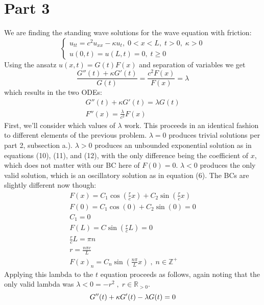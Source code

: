 \documentclass{article}
\begin{document}
\section*{Part 3}
We are finding the standing wave solutions for the wave equation with friction:
\[
  \begin{cases}
			u_{tt} = c^2u_{xx} - \kappa u_t ,\;  0 < x < L ,\;  t> 0 ,\;  \kappa >0\\                
			u(0,t) = u(L,t) = 0, \;  t \geq 0
            \end{cases}
\]
Using the ansatz $u(x,t) = G(t)F(x)$ and separation of variables we get 
\begin{equation}
\frac{G''(t) + \kappa G'(t)}{G(t)} = \frac{c^2F(x)}{F(x)} = \lambda
\end{equation}
which results in the two ODEs:
\begin{equation}
\begin{aligned}
G''(t) + \kappa G'(t) = \lambda G(t)\\
F''(x) = \frac{\lambda}{c^2}F(x)
\end{aligned}
\end{equation}
First, we'll consider which values of $\lambda$ work. This proceeds in an identical fashion to different elements of the previous problem. $\lambda = 0$ produces trivial solutions per part 2, subsection a.). $\lambda >0$ produces an unbounded exponential solution as in equations (10), (11), and (12), with the only difference being the coefficient of $x$, which does not matter with our BC here of $F(0) = 0$. $\lambda < 0$ produces the only valid solution, which is an oscillatory solution as in equation (6). The BCs are slightly different now though:
\begin{equation}
\begin{aligned}
F(x) = C_1\cos(\frac{r}{c}x) + C_2\sin(\frac{r}{c}x)\\
F(0) = C_1\cos(0) + C_2\sin(0)= 0\\
C_1 = 0\\
F(L) = C\sin(\frac{r}{c}L) = 0\\
\frac{r}{c}L = \pi n\\
r = \frac{n\pi c}{L}\\
F(x)_n =  C_n\sin(\frac{n\pi}{L}x) \; , \; n \in \mathbb{Z}^+
\end{aligned}
\end{equation} 
Applying this lambda to the $t$ equation proceeds as follows, again noting that the only valid lambda was $\lambda < 0 = -r^2 \; , \; r \in \mathbb{R}_{>0}$. 
\begin{equation}
G''(t) + \kappa G'(t) - \lambda G(t)=0\\
\end{equation}
\end{document}

